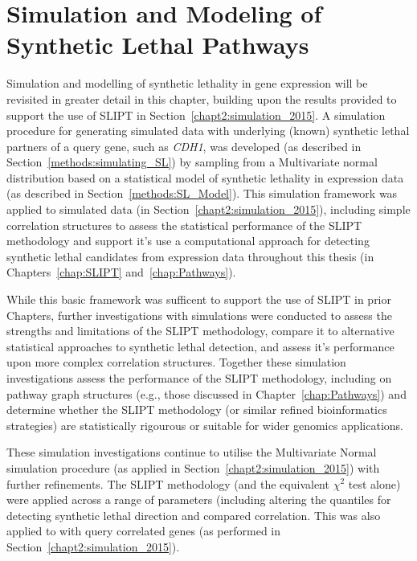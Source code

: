\chapter{Simulation and Modeling of Synthetic Lethal Pathways}
\label{chap:simulation}

Simulation and modelling of synthetic lethality in gene expression will be revisited in greater detail in this chapter, building upon the results provided to support the use of \gls{SLIPT} in Section~\ref{chapt2:simulation_2015}. A simulation procedure for generating simulated data with underlying (known) synthetic lethal partners of a query gene, such as \textit{CDH1}, was developed (as described in Section~\ref{methods:simulating_SL}) by sampling from a Multivariate normal distribution based on a statistical model of synthetic lethality in expression data (as described in Section~\ref{methods:SL_Model}). This simulation framework was applied to simulated data (in Section~\ref{chapt2:simulation_2015}), including simple correlation structures to assess the statistical performance of the \gls{SLIPT} methodology and support it's use a computational approach for detecting synthetic lethal candidates from expression data throughout this thesis (in Chapters~\ref{chap:SLIPT} and~\ref{chap:Pathways}). 

While this basic framework was sufficent to support the use of \gls{SLIPT} in prior Chapters, further investigations with simulations were conducted to assess the strengths and limitations of the \gls{SLIPT} methodology, compare it to alternative statistical approaches to synthetic lethal detection, and assess it's performance upon more complex correlation structures. Together these simulation investigations assess the performance of the \gls{SLIPT} methodology, including on pathway graph structures (e.g., those discussed in Chapter~\ref{chap:Pathways}) and determine whether the \gls{SLIPT} methodology (or similar refined bioinformatics strategies) are statistically rigourous or suitable for wider genomics applications.

These simulation investigations continue to utilise the Multivariate Normal simulation procedure (as applied in Section~\ref{chapt2:simulation_2015}) with further refinements. The \gls{SLIPT} methodology (and the equivalent $\chi^2$ test alone) were applied across a range of parameters (including altering the quantiles for detecting synthetic lethal direction and compared correlation. This was also applied to with query correlated genes (as performed in Section~\ref{chapt2:simulation_2015}).


